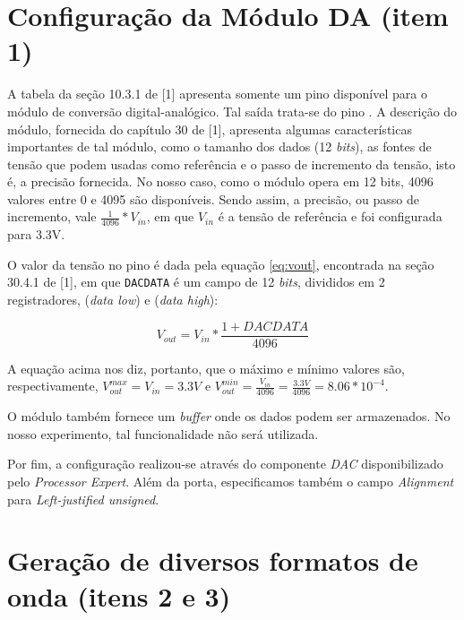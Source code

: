 \section{Configuração da Módulo DA (item 1)}

A tabela da seção 10.3.1 de [1] apresenta somente um pino disponível para o
módulo de conversão digital-analógico. Tal saída trata-se do pino .
A descrição do módulo, fornecida do capítulo 30 de [1], apresenta algumas
características importantes de tal módulo, como o tamanho dos  dados (12
\textit{bits}), as fontes de tensão que podem usadas como referência e o passo
de incremento da tensão, isto é, a precisão fornecida. No nosso caso, como o
módulo opera em 12 bits, 4096 valores entre 0 e 4095 são disponíveis. Sendo
assim, a precisão, ou passo de incremento, vale \(\frac{1}{4096}*V_{in}\), em
que \(V_{in}\) é a tensão de referência e foi configurada para 3.3V.

\vspace{12pt}

O valor da tensão no pino é dada pela equação \ref{eq:vout}, encontrada na seção
30.4.1 de [1], em que \texttt{DACDATA} é um campo de 12 \textit{bits}, divididos em 2
registradores,  (\textit{data low}) e 
(\textit{data high}):

\begin{equation}
\label{eq:vout}
V_{out} = V_{in}*\frac{1+DACDATA}{4096}
\end{equation}

A equação acima nos diz, portanto, que o máximo e mínimo valores são,
respectivamente, \(V_{out}^{max}=V_{in}=3.3V\) e
\(V_{out}^{min}=\frac{V_{in}}{4096}=\frac{3.3V}{4096}=8.06*10^{-4}\).

\vspace{12pt}

O módulo também fornece um \textit{buffer} onde os dados podem ser armazenados.
No nosso experimento, tal funcionalidade não será utilizada.

\vspace{12pt}

Por fim, a configuração realizou-se através do componente \textit{DAC}
disponibilizado pelo \textit{Processor Expert}. Além da porta, especificamos
também o campo \textit{Alignment} para \textit{Left-justified unsigned}.

\section{Geração de diversos formatos de onda (itens 2 e 3)}

